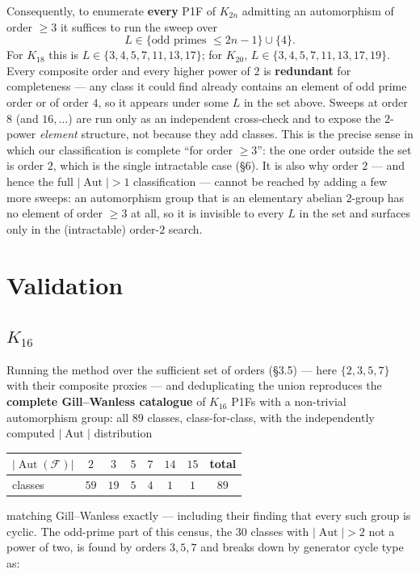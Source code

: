 \documentclass[11pt,reqno]{amsart}
\theoremstyle{plain}
\theoremstyle{definition}
\numberwithin{theorem}{section}
\newcommand{\Aut}{\operatorname{Aut}}
\begin{document}
Consequently, to enumerate \textbf{every} P1F of $K_{2n}$ admitting an automorphism of
order $\ge 3$ it suffices to run the sweep over
\[
L\in\{\text{odd primes }\le 2n-1\}\cup\{4\}.
\]
For $K_{18}$ this is $L\in\{3,4,5,7,11,13,17\}$; for $K_{20}$,
$L\in\{3,4,5,7,11,13,17,19\}$. Every composite order and every higher power of $2$ is
\textbf{redundant} for completeness --- any class it could find already contains an element
of odd prime order or of order $4$, so it appears under some $L$ in the set above.
Sweeps at order $8$ (and $16,\dots$) are run only as an independent cross-check and to
expose the $2$-power \emph{element} structure, not because they add classes. This is the
precise sense in which our classification is complete ``for order $\ge 3$'': the one
order outside the set is order $2$, which is the single intractable case (\S6). It is
also why order $2$ --- and hence the full $|\Aut|>1$ classification --- cannot be
reached by adding a few more sweeps: an automorphism group that is an elementary
abelian $2$-group has no element of order $\ge 3$ at all, so it is invisible to every
$L$ in the set and surfaces only in the (intractable) order-$2$ search.

\section{Validation}

\subsection{$K_{16}$}

Running the method over the sufficient set of orders (\S3.5) --- here $\{2,3,5,7\}$ with
their composite proxies --- and deduplicating the union reproduces the \textbf{complete
Gill--Wanless catalogue} of $K_{16}$ P1Fs with a non-trivial automorphism group: all
\textbf{$89$} classes, class-for-class, with the independently computed $|\Aut|$
distribution

\begin{center}
\begin{tabular}{lccccccc}
\toprule
$|\Aut(\mathcal F)|$ & $2$ & $3$ & $5$ & $7$ & $14$ & $15$ & \textbf{total} \\
\midrule
classes & $59$ & $19$ & $5$ & $4$ & $1$ & $1$ & \textbf{$89$} \\
\bottomrule
\end{tabular}
\end{center}

\noindent matching Gill--Wanless \cite{GillWanless} exactly --- including their finding that
every such group is cyclic. The odd-prime part of this census, the $30$ classes with
$|\Aut|>2$ not a power of two, is found by orders $3,5,7$ and breaks down by
generator cycle type as:
\end{document}
